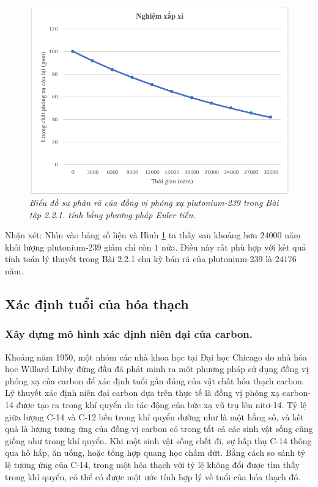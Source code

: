 \begin{figure}[!ht]
	\centering
	\includegraphics[scale=0.65]{Images/hinh_2_3.png}
	\caption[Biểu đồ sự phân rã của đồng vị phóng xạ plutonium-239 trong Bài tập 2.2.1. tính bằng phương pháp Euler tiến.]{\itshape\fontsize{13pt}{0pt}\selectfont\centering Biểu đồ sự phân rã của đồng vị phóng xạ plutonium-239 trong Bài tập 2.2.1. tính bằng phương pháp Euler tiến.}
	\label{hinh2.3}
\end{figure}
\noindent Nhận xét: Nhìn vào bảng số liệu và Hình \ref{hinh2.3} ta thấy sau khoảng hơn $24000$ năm khối lượng plutonium-239 giảm chỉ còn $1$ nửa. Điều này rất phù hợp với kết quả tính toán lý thuyết trong Bài 2.2.1 chu kỳ bán rã của plutonium-239 là $24176$ năm.    
\subsection{Xác định tuổi của hóa thạch}    
\subsubsection{Xây dựng mô hình xác định niên đại của carbon.}
Khoảng năm 1950, một nhóm các nhà khoa học tại Đại học Chicago do nhà hóa học Willard Libby đứng đầu đã phát minh ra một phương pháp sử dụng đồng vị phóng xạ của carbon để xác định tuổi gần đúng của vật chất hóa thạch carbon. Lý thuyết xác định niên đại carbon dựa trên thực tế là đồng vị phóng xạ carbon-14 được tạo ra trong khí quyển do tác động của bức xạ vũ trụ lên nitơ-14. Tỷ lệ giữa lượng 
C-14 và C-12 bền trong khí quyển dường như là một hằng số, và kết quả là lượng tương ứng của đồng vị carbon có trong tất cả các sinh vật sống cũng giống như trong khí quyển. Khi một sinh vật sống chết đi, sự hấp thụ C-14 thông qua hô hấp, ăn uống, hoặc tổng hợp quang học chấm dứt. Bằng cách so sánh tỷ lệ tương ứng của C-14, trong một hóa thạch với tỷ lệ không đổi được tìm thấy trong khí quyển, có thể có được một ước tính hợp lý về tuổi của hóa thạch đó.

